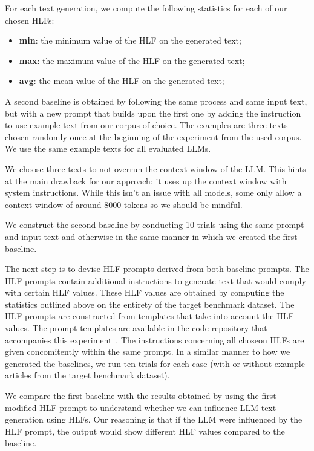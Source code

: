 \documentclass[runningheads,a4paper,11pt]{article}
\begin{document}
For each text generation, we compute the following statistics for each of our
chosen HLFs:

\begin{itemize}
    \item \textbf{min}: the minimum value of the HLF on the generated text;
    \item \textbf{max}: the maximum value of the HLF on the generated text;
    \item \textbf{avg}: the mean value of the HLF on the generated text;
\end{itemize}

A second baseline is obtained by following the same process and same input text,
but with a new prompt that builds upon the first one by adding the instruction
to use example text from our corpus of choice.
The examples are three texts chosen randomly once at the beginning of the
experiment from the used corpus.
We use the same example texts for all evaluated LLMs.

We choose three texts to not overrun the context window of the LLM.
This hints at the main drawback for our approach: it uses up the context window
with system instructions.
While this isn't an issue with all models, some only allow a context window of
around 8000 tokens so we should be mindful.

We construct the second baseline by conducting 10 trials using the same
prompt and input text and otherwise in the same manner in which we created the
first baseline.

The next step is to devise HLF prompts derived from both baseline prompts.
The HLF prompts contain additional instructions to generate text that would
comply with certain HLF values.
These HLF values are obtained by computing the statistics outlined above on
the entirety of the target benchmark dataset.
The HLF prompts are constructed from templates that take into account the HLF
values.
The prompt templates are available in the code repository that accompanies this
experiment~\cite{olar2024experimentcode}.
The instructions concerning all choseon HLFs are given concomitently within the
same prompt.
In a similar manner to how we generated the baselines, we run ten trials for
each case (with or without example articles from the target benchmark dataset).

We compare the first baseline with the results obtained by using the first
modified HLF prompt to understand whether we can influence LLM text generation
using HLFs.
Our reasoning is that if the LLM were influenced by the HLF prompt, the output
would show different HLF values compared to the baseline.
\end{document}
